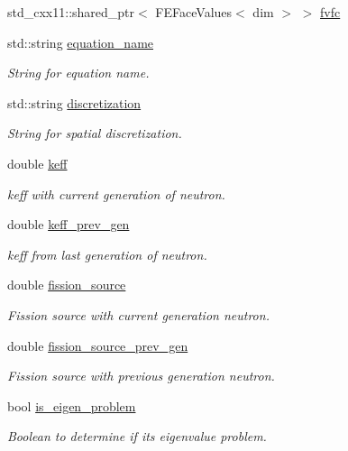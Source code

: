 \begin{DoxyCompactItemize}
\item 
std\+\_\+cxx11\+::shared\+\_\+ptr$<$ F\+E\+Face\+Values$<$ dim $>$ $>$ \hyperlink{class_equation_base_a6f6ca8b0e78bcbe0edd07f7967a0a6f9}{fvfc}
\item 
std\+::string \hyperlink{class_equation_base_a0a72472959e531f5256400dec911f3a5}{equation\+\_\+name}
\begin{DoxyCompactList}\small\item\em String for equation name. \end{DoxyCompactList}\item 
std\+::string \hyperlink{class_equation_base_adf124367d26087d33b6f252aa3cdd0a3}{discretization}
\begin{DoxyCompactList}\small\item\em String for spatial discretization. \end{DoxyCompactList}\item 
double \hyperlink{class_equation_base_ab3cf94dc329f486555f89bdb0dd94ed6}{keff}
\begin{DoxyCompactList}\small\item\em keff with current generation of neutron. \end{DoxyCompactList}\item 
double \hyperlink{class_equation_base_a80de7bca9496a5739f842ed154ecd274}{keff\+\_\+prev\+\_\+gen}
\begin{DoxyCompactList}\small\item\em keff from last generation of neutron. \end{DoxyCompactList}\item 
double \hyperlink{class_equation_base_aec6881c5aa66a28deab370236219f569}{fission\+\_\+source}
\begin{DoxyCompactList}\small\item\em Fission source with current generation neutron. \end{DoxyCompactList}\item 
double \hyperlink{class_equation_base_aac7587c6cd96b508a52f1ed4782b4806}{fission\+\_\+source\+\_\+prev\+\_\+gen}
\begin{DoxyCompactList}\small\item\em Fission source with previous generation neutron. \end{DoxyCompactList}\item 
bool \hyperlink{class_equation_base_a749f717dadd0df287fd0c366a7a8e0c1}{is\+\_\+eigen\+\_\+problem}
\begin{DoxyCompactList}\small\item\em Boolean to determine if it\textquotesingle{}s eigenvalue problem. \end{DoxyCompactList}\item 

\end{DoxyCompactItemize}
